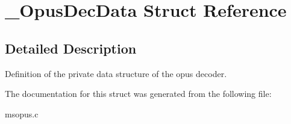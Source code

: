 \section{\_\-OpusDecData Struct Reference}
\label{struct__OpusDecData}


\subsection{Detailed Description}
Definition of the private data structure of the opus decoder. 

The documentation for this struct was generated from the following file:\begin{DoxyCompactItemize}
\item 
msopus.c\end{DoxyCompactItemize}
